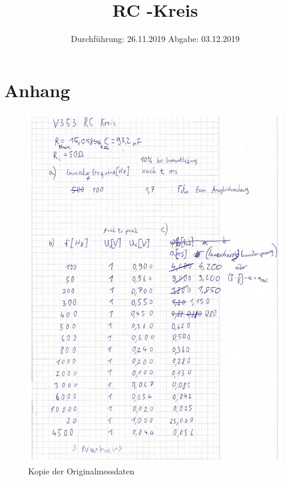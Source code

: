 

\subject{V353}
\title{RC -Kreis}
\date{%
  Durchführung: 26.11.2019
  \hspace{3em}
  Abgabe: 03.12.2019
}



\maketitle
\thispagestyle{empty}
\tableofcontents
\newpage







\printbibliography{}

\section{Anhang}
\begin{figure}[H]
  \centering
  \includegraphics[width=\textwidth-2cm]{images/originaldaten.jpg}
  \caption{Kopie der Originalmessdaten}
  \label{fig:originaldaten_1}
\end{figure}


